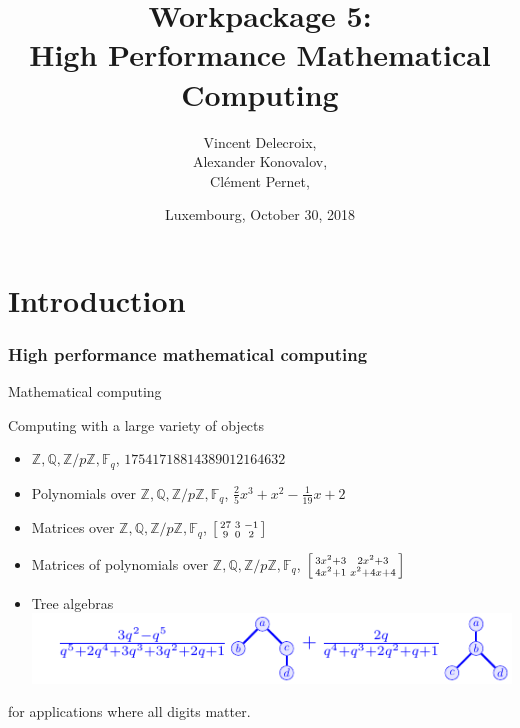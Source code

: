 \documentclass{beamer}
\title[WP 5]{Workpackage 5:\\ High Performance Mathematical Computing}
\author[V. Delecroix, A Konovalov, C. Pernet]{Vincent Delecroix, \\ Alexander Konovalov,\\ Clément Pernet, }
\date[Luxembourg, 2018-10-30]{Luxembourg, October 30, 2018}
\institute[ODK 2nd project review]{Second OpenDreamKit Project review}
\newenvironment{smatrix}{\left[\begin{smallmatrix}}{\end{smallmatrix}\right]}
\newcommand{\Z}{\ensuremath{\mathbb{Z}\xspace}}
\newcommand{\Q}{\ensuremath{\mathbb{Q}\xspace}}
\newcommand{\F}{\ensuremath{\mathbb{F}\xspace}}
\begin{document}
\maketitle

\section*{Introduction}

\begin{frame}
  \frametitle{High performance mathematical computing}

  \begin{block}{Mathematical computing}

    Computing with a large variety of objects
        \begin{itemize}[<+->]
        \item $\Z, \Q, \Z/p\Z, \F_q$, \hfill {\color{blue} $17541718814389012164632$}
        \item Polynomials over $\Z, \Q, \Z/p\Z, \F_q$, \hfill {\color{blue} $\frac{2}{5} x^{3} + x^{2} - \frac{1}{19} x + 2$}
        \item Matrices over $\Z, \Q, \Z/p\Z, \F_q$, \hfill
           {\color{blue} $\begin{smatrix} 27&3&-1\\ 9&0& 2 \end{smatrix} $}
        \item Matrices of polynomials over $\Z, \Q, \Z/p\Z, \F_q$, \hfill
          {\color{blue} $ \begin{smatrix}
            3 x^{2} + 3 & 2 x^{2} + 3 \\4 x^{2} + 1 & x^{2} + 4 x + 4
          \end{smatrix}$}
        \item Tree algebras \hfill
      \includegraphics[width=.7\textwidth]{Pictures/operade}
        \end{itemize}

        for applications where all digits matter.

  \end{block}
\end{frame}
\end{document}
